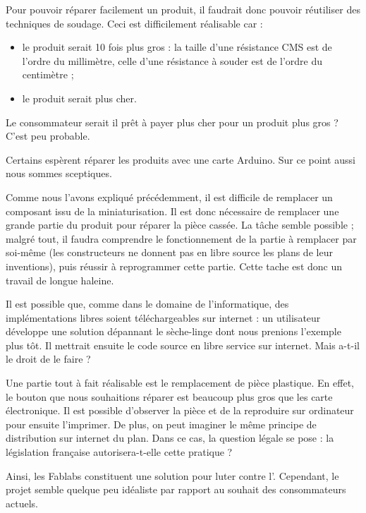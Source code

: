 Pour pouvoir  réparer facilement un produit, il faudrait donc pouvoir réutiliser des techniques de soudage. Ceci est difficilement réalisable car : 
\begin{itemize}
\item le produit serait 10 fois plus gros : la taille d'une résistance CMS est de l'ordre du millimètre, celle d'une résistance à souder est de l'ordre du centimètre ;
\item le produit serait plus cher. 
\end{itemize}
Le consommateur serait il prêt à payer plus cher pour un produit plus gros ? C'est peu probable.

\medbreak
Certains espèrent réparer les produits avec une carte Arduino. Sur ce point aussi nous sommes sceptiques. 

Comme nous l'avons expliqué précédemment, il est difficile de remplacer un composant issu de la miniaturisation. Il est donc nécessaire de remplacer une grande partie du produit pour réparer la pièce cassée. La tâche semble possible ; malgré tout, il faudra comprendre le fonctionnement de la partie à remplacer par soi-même (les constructeurs ne donnent pas en libre source les plans de leur inventions), puis réussir à reprogrammer cette partie. Cette tache est donc un travail de longue haleine. 

Il est possible que, comme dans le domaine de l'informatique, des implémentations libres soient téléchargeables sur internet : un utilisateur développe une solution dépannant le sèche-linge dont nous prenions l'exemple plus tôt. Il mettrait ensuite le code source en libre service sur internet. Mais a-t-il le droit de le faire ? 

\medbreak 

Une partie tout à fait réalisable est le remplacement de pièce plastique. En effet, le bouton que nous souhaitions réparer est beaucoup plus gros que les carte électronique. Il est possible d'observer la pièce et de la reproduire sur ordinateur pour ensuite l'imprimer. De plus, on peut imaginer le même principe de distribution sur internet du plan. Dans ce cas, la question légale se pose : la législation française autorisera-t-elle cette pratique ? 

\bigbreak

Ainsi, les Fablabs constituent une solution pour luter contre l'\op. Cependant, le projet semble quelque peu idéaliste par rapport au souhait des consommateurs actuels. 
